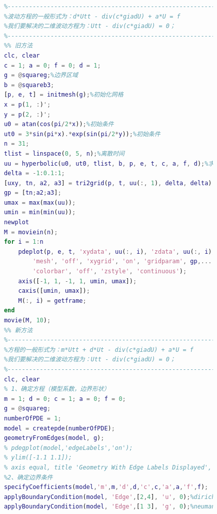             \begin{lstlisting}[language = Matlab]
            %%%%%%%%%%%%%%%%%%%%%%%%%  示例2:波动方程 %%%%%%%%%%%%%%%%%%%
            %------------------------------------------------------------
            %波动方程的一般形式为：d*Utt - div(c*giadU) + a*U = f
            %我们要解决的二维波动方程为：Utt - div(c*giadU) = 0；
            %------------------------------------------------------------
            %% 旧方法
            clc, clear
            c = 1; a = 0; f = 0; d = 1;
            g = @squareg;%边界区域
            b = @squareb3;
            [p, e, t] = initmesh(g);%初始化网格
            x = p(1, :)';
            y = p(2, :)';
            u0 = atan(cos(pi/2*x));%初始条件
            ut0 = 3*sin(pi*x).*exp(sin(pi/2*y));%初始条件
            n = 31;
            tlist = linspace(0, 5, n);%离散时间
            uu = hyperbolic(u0, ut0, tlist, b, p, e, t, c, a, f, d);%求解双曲线型PDE方程，uu是一个31列的矩阵，每个时间t为一列
            delta = -1:0.1:1;
            [uxy, tn, a2, a3] = tri2grid(p, t, uu(:, 1), delta, delta);%将三角形网格转化为矩形网格
            gp = [tn;a2;a3];
            umax = max(max(uu));
            umin = min(min(uu));
            newplot
            M = moviein(n);
            for i = 1:n
                pdeplot(p, e, t, 'xydata', uu(:, i), 'zdata', uu(:, i), ...
                    'mesh', 'off', 'xygrid', 'on', 'gridparam', gp,...
                    'colorbar', 'off', 'zstyle', 'continuous');
                axis([-1, 1, -1, 1, umin, umax]);
                caxis([umin, umax]);
                M(:, i) = getframe;
            end
            movie(M, 10);
            %% 新方法
            %-----------------------------------------------------------------------
            %方程的一般形式为：m*Utt + d*Ut - div(c*giadU) + a*U = f
            %我们要解决的二维波动方程为：Utt - div(c*giadU) = 0；
            %-----------------------------------------------------------------------
            clc, clear
            % 1、确定方程（模型系数，边界形状）
            m = 1; d = 0; c = 1; a = 0; f = 0;
            g = @squareg;
            numberOfPDE = 1;
            model = createpde(numberOfPDE);
            geometryFromEdges(model, g);
            % pdegplot(model,'edgeLabels','on');
            % ylim([-1.1 1.1]);
            % axis equal, title 'Geometry With Edge Labels Displayed', xlabel x, ylabel y
            %2、确定边界条件
            specifyCoefficients(model,'m',m,'d',d,'c',c,'a',a,'f',f);
            applyBoundaryCondition(model, 'Edge',[2,4], 'u', 0);%dirichlet边界条件
            applyBoundaryCondition(model, 'Edge',[1 3], 'g', 0);%neumann边界条件

\end{lstlisting}
